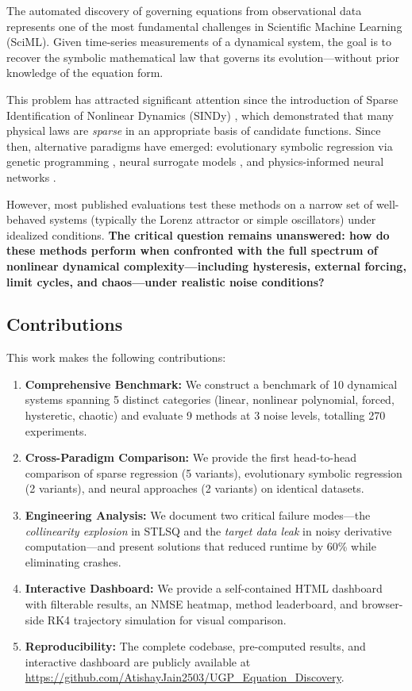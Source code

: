 \documentclass[conference]{IEEEtran}
\begin{document}
The automated discovery of governing equations from observational data represents one of the most fundamental challenges in Scientific Machine Learning (SciML). Given time-series measurements of a dynamical system, the goal is to recover the symbolic mathematical law that governs its evolution---without prior knowledge of the equation form.

This problem has attracted significant attention since the introduction of Sparse Identification of Nonlinear Dynamics (SINDy) \cite{brunton2016}, which demonstrated that many physical laws are \textit{sparse} in an appropriate basis of candidate functions. Since then, alternative paradigms have emerged: evolutionary symbolic regression via genetic programming \cite{cranmer2023}, neural surrogate models \cite{chen2018}, and physics-informed neural networks \cite{raissi2019}.

However, most published evaluations test these methods on a narrow set of well-behaved systems (typically the Lorenz attractor or simple oscillators) under idealized conditions. \textbf{The critical question remains unanswered: how do these methods perform when confronted with the full spectrum of nonlinear dynamical complexity---including hysteresis, external forcing, limit cycles, and chaos---under realistic noise conditions?}

\subsection{Contributions}

This work makes the following contributions:

\begin{enumerate}
    \item \textbf{Comprehensive Benchmark:} We construct a benchmark of 10 dynamical systems spanning 5 distinct categories (linear, nonlinear polynomial, forced, hysteretic, chaotic) and evaluate 9 methods at 3 noise levels, totalling 270 experiments.
    
    \item \textbf{Cross-Paradigm Comparison:} We provide the first head-to-head comparison of sparse regression (5 variants), evolutionary symbolic regression (2 variants), and neural approaches (2 variants) on identical datasets.
    
    \item \textbf{Engineering Analysis:} We document two critical failure modes---the \textit{collinearity explosion} in STLSQ and the \textit{target data leak} in noisy derivative computation---and present solutions that reduced runtime by 60\% while eliminating crashes.
    
    \item \textbf{Interactive Dashboard:} We provide a self-contained HTML dashboard with filterable results, an NMSE heatmap, method leaderboard, and browser-side RK4 trajectory simulation for visual comparison.
    
    \item \textbf{Reproducibility:} The complete codebase, pre-computed results, and interactive dashboard are publicly available at \url{https://github.com/AtishayJain2503/UGP_Equation_Discovery}.
\end{enumerate}
\end{document}
